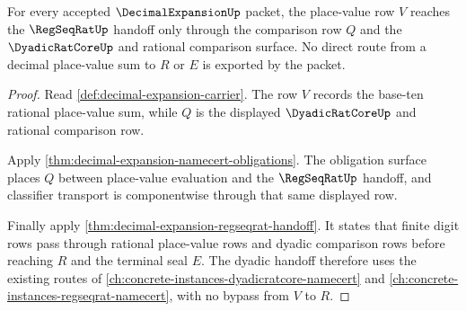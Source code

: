 \begin{theorem}\label{thm:decimal-expansion-dyadic-comparison-handoff}
For every accepted $\DecimalExpansionUp$ packet, the place-value row $V$ reaches the $\RegSeqRatUp$ handoff only through the comparison row $Q$ and the $\DyadicRatCoreUp$ and rational comparison surface. No direct route from a decimal place-value sum to $R$ or $E$ is exported by the packet.
\end{theorem}
\begin{proof}
Read \autoref{def:decimal-expansion-carrier}. The row $V$ records the base-ten rational place-value sum, while $Q$ is the displayed $\DyadicRatCoreUp$ and rational comparison row.

Apply \autoref{thm:decimal-expansion-namecert-obligations}. The obligation surface places $Q$ between place-value evaluation and the $\RegSeqRatUp$ handoff, and classifier transport is componentwise through that same displayed row.

Finally apply \autoref{thm:decimal-expansion-regseqrat-handoff}. It states that finite digit rows pass through rational place-value rows and dyadic comparison rows before reaching $R$ and the terminal seal $E$. The dyadic handoff therefore uses the existing routes of \autoref{ch:concrete-instances-dyadicratcore-namecert} and \autoref{ch:concrete-instances-regseqrat-namecert}, with no bypass from $V$ to $R$.
\end{proof}

